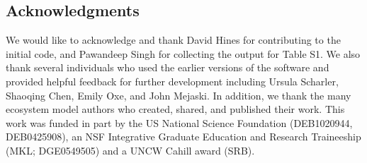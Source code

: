 \documentclass[11pt]{article}
\newcommand{\enaR}{\texttt{enaR}}
\begin{document}
\begin{spacing}{2}



\section{Acknowledgments}
We would like to acknowledge and thank David Hines for contributing to
the initial code, and Pawandeep Singh for collecting the output for
Table S1.  We also thank several individuals who used the earlier
versions of the software and provided helpful feedback for further
development including Ursula Scharler, Shaoqing Chen, Emily Oxe, and
John Mejaski.  In addition, we thank the many ecosystem model authors
who created, shared, and published their work.  This work was funded
in part by the US National Science Foundation (DEB1020944,
DEB0425908), an NSF Integrative Graduate Education and Research
Traineeship (MKL; DGE0549505) and a UNCW Cahill award (SRB).

\end{spacing}
\end{document}
